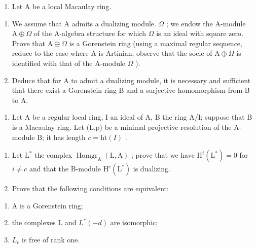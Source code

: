
\begin{enumerate}
\def\labelenumi{\arabic{enumi})}
\tightlist
\item
  Let A be a local Macaulay ring.
\end{enumerate}

\begin{enumerate}
\def\labelenumi{\alph{enumi})}
\item
  We assume that A admits a dualizing module. \(\Omega\) ; we endow the A-module \(\mathrm{A} \oplus \Omega\) of the A-algebra structure for which \(\Omega\) is an ideal with square zero. Prove that \(\mathrm{A} \oplus \Omega\) is a Gorenstein ring (using a maximal regular sequence, reduce to the case where A is Artinian; observe that the socle of \(\mathrm{A} \oplus \Omega\) is identified with that of the A-module \(\Omega\) ).
\item
  Deduce that for A to admit a dualizing module, it is necessary and sufficient that there exist a Gorenstein ring B and a surjective homomorphism from B to A.
\end{enumerate}

\begin{enumerate}
\def\labelenumi{\arabic{enumi})}
\setcounter{enumi}{1}
\tightlist
\item
  Let A be a regular local ring, I an ideal of A, B the ring A/I; suppose that B is a Macaulay ring. Let (L,p) be a minimal projective resolution of the A-module B; it has length \(c = \text{ht}(I)\) .
\end{enumerate}

\begin{enumerate}
\def\labelenumi{\alph{enumi})}
\item
  Let \(\mathrm{L}^*\) the complex \(\operatorname{Homgr}_{\mathrm{A}}(\mathrm{L},\mathrm{A})\) ; prove that we have \(\mathrm{H}^{i}(\mathrm{L}^{*}) = 0\) for \(i\neq c\) and that the B-module \(\mathrm{H}^c (\mathrm{L}^*)\) is dualizing.
\item
  Prove that the following conditions are equivalent:
\end{enumerate}

\begin{enumerate}
\def\labelenumi{(\roman{enumi})}
\item
  A is a Gorenstein ring;
\item
  the complexes L and \(L^{*}(-d)\) are isomorphic;
\item
  \(L_{c}\) is free of rank one.
\end{enumerate}

